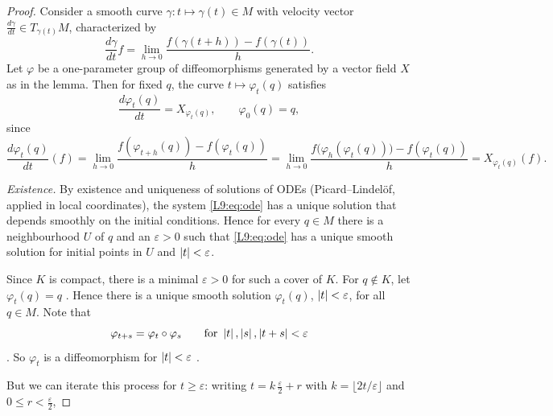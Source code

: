 \begin{proof}
Consider a smooth curve $\gamma\colon t\mapsto\gamma(t)\in M$ with velocity vector
$\frac{d\gamma}{dt}\in T_{\gamma(t)}M$, characterized by
\[
  \frac{d\gamma}{dt}f=\lim_{h\to0}\frac{f(\gamma(t+h))-f(\gamma(t))}{h}.
\]
Let $\varphi$ be a one-parameter group of diffeomorphisms generated by a vector field $X$ as in
the lemma. Then for fixed $q$, the curve $t\mapsto\varphi_t(q)$ satisfies
\begin{equation}\label{L9:eq:ode}
  \frac{d\varphi_t(q)}{dt}=X_{\varphi_t(q)},\qquad \varphi_0(q)=q ,
\end{equation}
since
\[
  \frac{d\varphi_t(q)}{dt}(f)=\lim_{h\to0}\frac{f(\varphi_{t+h}(q))-f(\varphi_t(q))}{h}
  =\lim_{h\to0}\frac{f\bigl(\varphi_h(\varphi_t(q))\bigr)-f(\varphi_t(q))}{h}
  =X_{\varphi_t(q)}(f).
\]

\emph{Existence.} By existence and uniqueness of solutions of ODEs (Picard--Lindel\"of, applied in
local coordinates), the system \eqref{L9:eq:ode} has a unique solution that depends smoothly on
the initial conditions. Hence for every $q\in M$ there is a neighbourhood $U$ of $q$ and
an $\varepsilon>0$ such that \eqref{L9:eq:ode} has a unique smooth solution for initial points in
$U$ and $\left\lvert t \right\rvert<\varepsilon$.

Since $K$ is compact,  there is a minimal
$\varepsilon>0$ for such a cover of $K$. For $q\notin K$, let $\varphi_t(q)=q$
. Hence there is a unique smooth
solution $\varphi_t(q)$, $\left\lvert t \right\rvert<\varepsilon$, for all $q\in M$.
Note that
\[
  \varphi_{t+s}=\varphi_t\circ\varphi_s\qquad\text{for }\left\lvert t \right\rvert,\left\lvert s \right\rvert,\left\lvert t+s \right\rvert<\varepsilon
\]
.
So $\varphi_t$ is a diffeomorphism for $\left\lvert t \right\rvert<\varepsilon$ .

But we can iterate this process for $t\ge\varepsilon$:
writing $t=k\,\tfrac{\varepsilon}{2}+r$ with $k=\lfloor 2t/\varepsilon\rfloor$ and
$0\le r<\tfrac{\varepsilon}{2}$, 
\end{proof}

